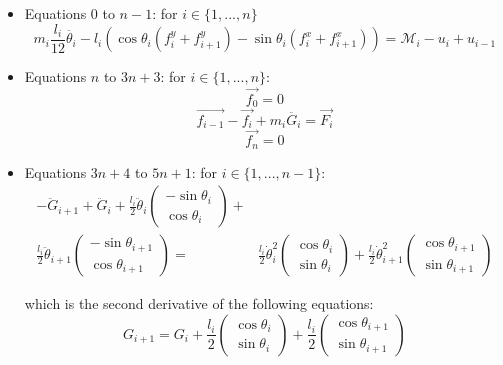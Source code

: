 \documentclass{article}
\begin{document}
\begin{itemize}
    \item Equations $0$ to $n-1$: for $i \in \{1, ..., n\}$
    \begin{equation}
        m_i \frac{l_i}{12} \ddot{\theta_i} - l_i \left(  \cos\theta_i (f_i^y + f_{i+1}^y) - \sin\theta_i (f_i^x + f_{i+1}^x) \right)= \mathcal{M}_i - u_i + u_{i-1}
    \end{equation}
    
    \item Equations $n$ to $3n+3$: for $i \in \{1, ..., n\}$:
    \begin{equation}
        \vec{f_0} = 0
    \end{equation}
    \begin{equation}
        \vec{f_{i-1}} - \vec{f_i} + m_i \ddot{G_i} = \vec{F_i}
    \end{equation}
    \begin{equation}
        \vec{f_n} = 0
    \end{equation}
    
    \item Equations $3n+4$ to $5n+1$: for $i \in \{1, ..., n-1\}$:
    \begin{equation}
    \begin{split}
    -\ddot{G}_{i+1} + \ddot{G}_{i} + \frac{l_i}{2} \ddot{\theta}_{i} \begin{pmatrix}
        -\sin \theta_{i} \\
        \cos \theta_{i} 
    \end{pmatrix} + \\ \frac{l_i}{2} \ddot{\theta}_{i+1} \begin{pmatrix}
        -\sin \theta_{i+1} \\
        \cos \theta_{i+1} 
    \end{pmatrix} =  
    & \frac{l_i}{2} \dot{\theta}_{i}^2 \begin{pmatrix}
        \cos \theta_{i} \\
        \sin \theta_{i} 
    \end{pmatrix} + \frac{l_i}{2} \dot{\theta}_{i+1}^2 \begin{pmatrix}
        \cos \theta_{i+1} \\
        \sin \theta_{i+1} 
    \end{pmatrix}
    \end{split}
    \end{equation}
    
    which is the second derivative of the following equations:
    \begin{equation}
        G_{i+1} = G_i + \frac{l_i}{2} \begin{pmatrix}
        \cos \theta_{i} \\
        \sin \theta_{i} 
    \end{pmatrix} + \frac{l_i}{2} \begin{pmatrix}
        \cos \theta_{i+1} \\
        \sin \theta_{i+1} 
    \end{pmatrix}
    \end{equation}

\end{itemize}
\end{document}
